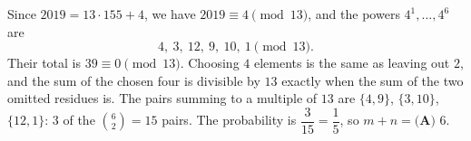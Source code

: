 Since $2019=13\cdot155+4$, we have $2019\equiv4\pmod{13}$, and the powers $4^1,\dots,4^6$ are
\[
4,\ 3,\ 12,\ 9,\ 10,\ 1\pmod{13}.
\]
Their total is $39\equiv0\pmod{13}$. Choosing $4$ elements is the same as leaving out $2$, and the sum of the chosen four is divisible by $13$ exactly when the sum of the two omitted residues is. The pairs summing to a multiple of $13$ are $\{4,9\}$, $\{3,10\}$, $\{12,1\}$: $3$ of the $\binom62=15$ pairs. The probability is $\dfrac{3}{15}=\dfrac{1}{5}$, so $m+n=\boxed{\textbf{(A) }6}$.
